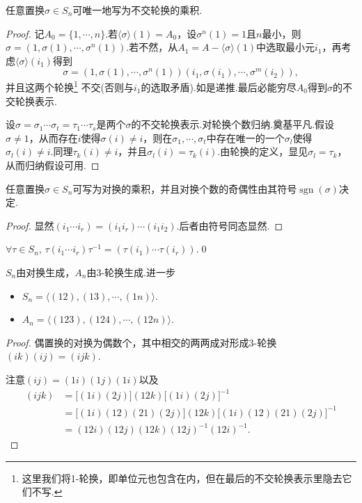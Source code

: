 \begin{prop}
	任意置换$\sigma\in S_n$可唯一地写为不交轮换的乘积.
\end{prop}
\begin{proof}
	记$A_0=\{1,\cdots,n\}$.若$\langle \sigma\rangle (1)=A_0$，设$\sigma^n(1)=1$且$n$最小，则$\sigma=(1,\sigma(1),\cdots,\sigma^n(1))$.若不然，从$A_1=A-\langle \sigma\rangle (1)$中选取最小元$i_1$，再考虑$\langle \sigma\rangle (i_1)$得到
	\[
		\sigma=(1,\sigma(1),\cdots,\sigma^n(1))(i_1,\sigma(i_1),\cdots,\sigma^m(i_2)),
	\]
	并且这两个轮换\footnote{这里我们将1-轮换，即单位元也包含在内，但在最后的不交轮换表示里隐去它们不写.} 不交(否则与$i_1$的选取矛盾).如是递推.最后必能穷尽$A_0$得到$\sigma$的不交轮换表示.

	设$\sigma=\sigma_1\cdots\sigma_t=\tau_1\cdots\tau_s$是两个$\sigma$的不交轮换表示.对轮换个数归纳.奠基平凡.假设$\sigma\ne 1$，从而存在$i$使得$\sigma(i)\ne i$，则在$\sigma_1,\cdots,\sigma_t$中存在唯一的一个$\sigma_l$使得$\sigma_l(i)\ne i$.同理$\tau_k(i)\ne i$，并且$\sigma_l(i)=\tau_k(i)$.由轮换的定义，显见$\sigma_l=\tau_k$，从而归纳假设可用.
\end{proof}

\begin{cor*}
	任意置换$\sigma\in S_n$可写为对换的乘积，并且对换个数的奇偶性由其符号$\operatorname*{sgn}(\sigma)$决定.
\end{cor*}
\begin{proof}
	显然$(i_1\cdots i_r)=(i_1i_r)\cdots(i_1i_2)$.后者由符号同态显然.
\end{proof}
\begin{lemma*}[(共轭)]
	$\forall\tau\in S_n,\,\tau(i_1\cdots i_r)\tau^{-1}=(\tau(i_1)\cdots\tau(i_r))$.\qed\hypertarget{ConjugationInSymmetry}{}
\end{lemma*}
\begin{cor*}
	$S_n$由对换生成，$A_n$由3-轮换生成.进一步
	\begin{itemize}
		\item $S_n=\langle (12),(13),\cdots,(1n)\rangle $.
		\item $A_n=\langle (123),(124),\cdots,(12n)\rangle $.
	\end{itemize}
\end{cor*}
\begin{proof}
	偶置换的对换为偶数个，其中相交的两两成对形成3-轮换$(ik)(ij)=(ijk)$.

	注意$(ij)=(1i)(1j)(1i)$以及
	\begin{align*}
		(ijk) & =\big[(1i)(2j)\big](12k)\big[(1i)(2j)\big]^{-1}                 \\
		      & =\big[(1i)(12)(21)(2j)\big](12k)\big[(1i)(12)(21)(2j)\big]^{-1} \\
		      & =(12i)(12j)(12k)(12j)^{-1}(12i)^{-1}.
	\end{align*}
\end{proof}

